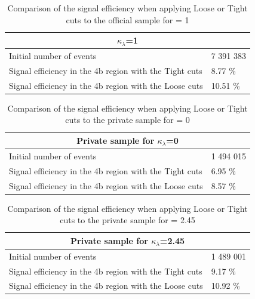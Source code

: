 \begin{table}[hbt]
\centering
    \begin{tabular}{ |p{10cm}|p{3cm}| }
 \hline
 \multicolumn{2}{|c|}{$\kappa_\lambda$=1} \\
 \hline
 Initial number of events & 7 391 383 \\
 Signal efficiency in the 4b region with the {Tight cuts}  & 8.77 \%\\
 Signal efficiency in the 4b region with the {Loose cuts}  &  10.51 \% \\
 \hline
 \end{tabular}
\caption{Comparison of the signal efficiency when applying Loose or Tight cuts to the official sample for \kl = 1}
\label{table: SE kl 1}
\end{table}



\begin{table}[hbt]
\centering
    \begin{tabular}{ |p{10cm}|p{3cm}| }
 \hline
 \multicolumn{2}{|c|}{Private sample for $\kappa_\lambda$=0} \\
 \hline
 Initial number of events & 1 494 015 \\
 Signal efficiency in the 4b region with the Tight cuts  & 6.95 \% \\
 Signal efficiency in the 4b region with the Loose cuts  &  8.57 \% \\
 \hline
 \end{tabular}
  \caption{Comparison of the signal efficiency when applying Loose or Tight cuts to the private sample for \kl = 0}
  \label{table: SE kl 0}
\end{table}



\begin{table}[hbt]
    \centering
     \begin{tabular}{ |p{10cm}|p{3cm}| }
 \hline
 \multicolumn{2}{|c|}{Private sample for $\kappa_\lambda$=2.45} \\
 \hline
 Initial number of events & 1 489 001 \\
 Signal efficiency in the 4b region with the Tight cuts  & 9.17 \% \\
 Signal efficiency in the 4b region with the Loose cuts  &  10.92 \% \\
 \hline
 \end{tabular}
  \caption{Comparison of the signal efficiency when applying Loose or Tight cuts to the private sample for \kl = 2.45}
  \label{table: SE kl 2p45}
\end{table}


